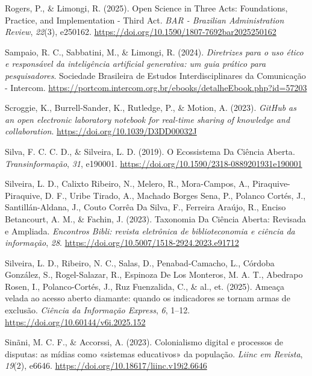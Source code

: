 \documentclass[
  a4paper,
]{book}
\newlength{\cslhangindent}
\newenvironment{CSLReferences}[2] %
 {\begin{list}{}{%
  \setlength{\itemindent}{0pt}
  \setlength{\leftmargin}{0pt}
  \setlength{\parsep}{0pt}
  \ifodd #1
   \setlength{\leftmargin}{\cslhangindent}
   \setlength{\itemindent}{-1\cslhangindent}
  \fi
  \setlength{\itemsep}{#2\baselineskip}}}
 {\end{list}}
\begin{document}
\begin{CSLReferences}{1}{0}
Rogers, P., \& Limongi, R. (2025). Open Science in Three Acts:
Foundations, Practice, and Implementation - Third Act. \emph{BAR -
Brazilian Administration Review}, \emph{22}(3), e250162.
\url{https://doi.org/10.1590/1807-7692bar2025250162}

Sampaio, R. C., Sabbatini, M., \& Limongi, R. (2024). \emph{Diretrizes
para o uso ético e responsável da inteligência artificial generativa: um
guia prático para pesquisadores}. Sociedade Brasileira de Estudos
Interdisciplinares da Comunicação - Intercom.
\url{https://portcom.intercom.org.br/ebooks/detalheEbook.php?id=57203}

Scroggie, K., Burrell-Sander, K., Rutledge, P., \& Motion, A. (2023).
\emph{GitHub as an open electronic laboratory notebook for real-time
sharing of knowledge and collaboration}.
\url{https://doi.org/10.1039/D3DD00032J}

Silva, F. C. C. D., \& Silveira, L. D. (2019). O Ecossistema Da
{Ci{ê}ncia Aberta}. \emph{Transinforma{ç}{ã}o}, \emph{31}, e190001.
\url{https://doi.org/10.1590/2318-0889201931e190001}

Silveira, L. D., Calixto Ribeiro, N., Melero, R., Mora-Campos, A.,
Piraquive-Piraquive, D. F., Uribe Tirado, A., Machado Borges Sena, P.,
Polanco Cortés, J., Santillán-Aldana, J., Couto Corrêa Da Silva, F.,
Ferreira Araújo, R., Enciso Betancourt, A. M., \& Fachin, J. (2023).
Taxonomia Da {Ci{ê}ncia Aberta}: Revisada e Ampliada. \emph{Encontros
Bibli: revista eletr{ô}nica de biblioteconomia e ci{ê}ncia da
informa{ç}{ã}o}, \emph{28}.
\url{https://doi.org/10.5007/1518-2924.2023.e91712}

Silveira, L. D., Ribeiro, N. C., Salas, D., Penabad-Camacho, L., Córdoba
González, S., Rogel-Salazar, R., Espinoza De Los Monteros, M. A. T.,
Abedrapo Rosen, I., Polanco-Cortés, J., Ruz Fuenzalida, C., \& al., et.
(2025). Ameaça velada ao acesso aberto diamante: quando os indicadores
se tornam armas de exclusão. \emph{Ciência da Informação Express},
\emph{6}, 1--12. \url{https://doi.org/10.60144/v6i.2025.152}

Sinãni, M. C. F., \& Accorssi, A. (2023). Colonialismo digital e
processos de disputas: as mídias como {«sistemas educativos»} da
população. \emph{Liinc em Revista}, \emph{19}(2), e6646.
\url{https://doi.org/10.18617/liinc.v19i2.6646}


\end{CSLReferences}
\end{document}
